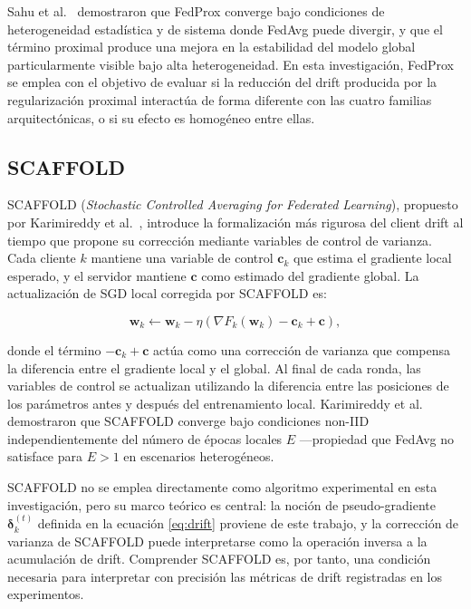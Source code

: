 Sahu et al.\ \cite{DBLP:journals/corr/abs-1812-06127} demostraron que FedProx converge bajo
condiciones de heterogeneidad estadística y de sistema donde FedAvg puede divergir, y que el
término proximal produce una mejora en la estabilidad del modelo global particularmente visible
bajo alta heterogeneidad. En esta investigación, FedProx se emplea con el objetivo de
evaluar si la reducción del drift producida por la regularización proximal interactúa de forma
diferente con las cuatro familias arquitectónicas, o si su efecto es homogéneo entre ellas.

\subsection{SCAFFOLD}

SCAFFOLD (\textit{Stochastic Controlled Averaging for Federated Learning}),
propuesto por Karimireddy et al.\ \cite{DBLP:journals/corr/abs-1910-06378}, introduce la
formalización más rigurosa del client drift al tiempo que propone su corrección mediante
variables de control de varianza. Cada cliente $k$ mantiene una variable de control
$\mathbf{c}_k$ que estima el gradiente local esperado, y el servidor mantiene $\mathbf{c}$
como estimado del gradiente global. La actualización de SGD local corregida por SCAFFOLD es:

\begin{equation}
  \mathbf{w}_k \leftarrow \mathbf{w}_k - \eta \left( \nabla F_k(\mathbf{w}_k)
  - \mathbf{c}_k + \mathbf{c} \right),
  \label{eq:scaffold}
\end{equation}

donde el término $-\mathbf{c}_k + \mathbf{c}$ actúa como una corrección de varianza que
compensa la diferencia entre el gradiente local y el global. Al final de cada ronda, las
variables de control se actualizan utilizando la diferencia entre las posiciones de los
parámetros antes y después del entrenamiento local. Karimireddy et al.\
\cite{DBLP:journals/corr/abs-1910-06378} demostraron que SCAFFOLD converge bajo condiciones
non-IID independientemente del número de épocas locales $E$ —propiedad que FedAvg no satisface
para $E > 1$ en escenarios heterogéneos.

SCAFFOLD no se emplea directamente como algoritmo experimental en esta investigación, pero su
marco teórico es central: la noción de pseudo-gradiente $\boldsymbol{\delta}_k^{(t)}$ definida
en la ecuación \eqref{eq:drift} proviene de este trabajo, y la corrección de varianza de
SCAFFOLD puede interpretarse como la operación inversa a la acumulación de drift. Comprender
SCAFFOLD es, por tanto, una condición necesaria para interpretar con precisión las métricas de
drift registradas en los experimentos.

